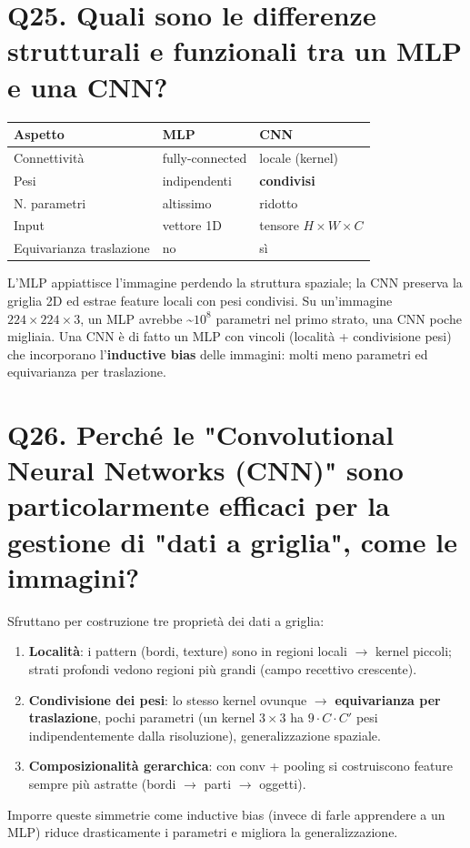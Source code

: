 \documentclass[11pt,a4paper]{article}
\begin{document}
\section*{Q25. Quali sono le differenze strutturali e funzionali tra un MLP e una CNN?}
\begin{center}\renewcommand{\arraystretch}{1.25}
\begin{tabular}{|l|l|l|}\hline
\textbf{Aspetto} & \textbf{MLP} & \textbf{CNN} \\ \hline
Connettività & fully-connected & locale (kernel) \\ \hline
Pesi & indipendenti & \textbf{condivisi} \\ \hline
N. parametri & altissimo & ridotto \\ \hline
Input & vettore 1D & tensore $H\times W\times C$ \\ \hline
Equivarianza traslazione & no & sì \\ \hline
\end{tabular}\end{center}
L'MLP appiattisce l'immagine perdendo la struttura spaziale; la CNN preserva la griglia 2D ed estrae feature locali con pesi condivisi. Su un'immagine $224\times 224\times 3$, un MLP avrebbe \textasciitilde{}$10^{8}$ parametri nel primo strato, una CNN poche migliaia. Una CNN è di fatto un MLP con vincoli (località + condivisione pesi) che incorporano l'\textbf{inductive bias} delle immagini: molti meno parametri ed equivarianza per traslazione.
\newpage
\section*{Q26. Perché le "Convolutional Neural Networks (CNN)" sono particolarmente efficaci per la gestione di "dati a griglia", come le immagini?}
Sfruttano per costruzione tre proprietà dei dati a griglia:
\begin{enumerate}
\item \textbf{Località}: i pattern (bordi, texture) sono in regioni locali $\to $ kernel piccoli; strati profondi vedono regioni più grandi (campo recettivo crescente).
\item \textbf{Condivisione dei pesi}: lo stesso kernel ovunque $\to $ \textbf{equivarianza per traslazione}, pochi parametri (un kernel $3\times 3$ ha $9\cdot C\cdot C'$ pesi indipendentemente dalla risoluzione), generalizzazione spaziale.
\item \textbf{Composizionalità gerarchica}: con conv + pooling si costruiscono feature sempre più astratte (bordi $\to $ parti $\to $ oggetti).
\end{enumerate}
Imporre queste simmetrie come inductive bias (invece di farle apprendere a un MLP) riduce drasticamente i parametri e migliora la generalizzazione.
\newpage
\end{document}
